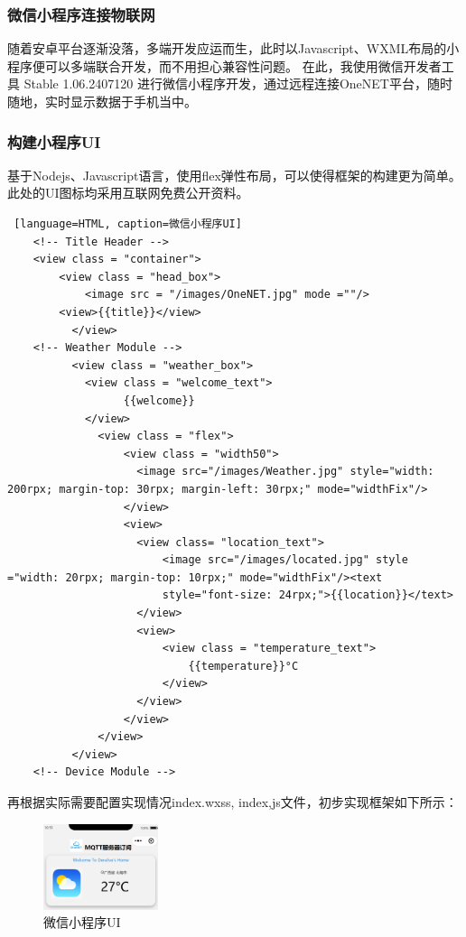 \subsubsection{微信小程序连接物联网}

随着安卓平台逐渐没落，多端开发应运而生，此时以Javascript、WXML布局的小程序便可以多端联合开发，而不用担心兼容性问题。
在此，我使用微信开发者工具 Stable 1.06.2407120 进行微信小程序开发，通过远程连接OneNET平台，随时随地，实时显示数据于手机当中。

\subsubsection{构建小程序UI}

基于Nodejs、Javascript语言，使用flex弹性布局，可以使得框架的构建更为简单。
此处的UI图标均采用互联网免费公开资料。

\begin{lstlisting} [language=HTML, caption=微信小程序UI]
    <!-- Title Header -->
    <view class = "container">
        <view class = "head_box">
            <image src = "/images/OneNET.jpg" mode =""/>
        <view>{{title}}</view>
          </view>
    <!-- Weather Module -->
          <view class = "weather_box">
            <view class = "welcome_text">
                  {{welcome}}
            </view>
              <view class = "flex">
                  <view class = "width50">
                    <image src="/images/Weather.jpg" style="width: 200rpx; margin-top: 30rpx; margin-left: 30rpx;" mode="widthFix"/>
                  </view>
                  <view>
                    <view class= "location_text">
                        <image src="/images/located.jpg" style ="width: 20rpx; margin-top: 10rpx;" mode="widthFix"/><text
                        style="font-size: 24rpx;">{{location}}</text>
                    </view>
                    <view>
                        <view class = "temperature_text">
                            {{temperature}}°C
                        </view>
                    </view>
                  </view>
              </view>
          </view>
    <!-- Device Module -->
\end{lstlisting}

再根据实际需要配置实现情况index.wxss, index,js文件，初步实现框架如下所示：

\begin{figure} [H]
    \centering
    \includegraphics[width=0.3\textwidth]{img/WechatUI.png}
    \caption{微信小程序UI}
    \label{fig:WechatUI}
\end{figure}

